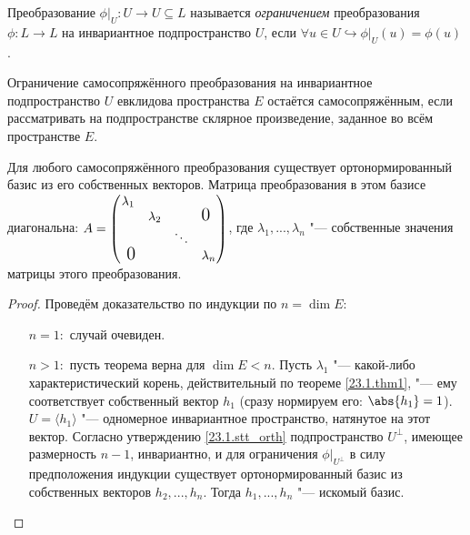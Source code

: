   \begin{defn}
  Преобразование $\phi|_U:U\rightarrow U \subseteq L$ называется \textit{ограничением} преобразования $\phi:L\rightarrow L$ на инвариантное подпространство $U$, если $\forall u \in U \hookrightarrow \phi|_U(u)=\phi(u)$.
  \end{defn}  
  \begin{notion}
  Ограничение самосопряжённого преобразования на инвариантное подпространство $U$ евклидова пространства $E$ остаётся самосопряжённым, если рассматривать на подпространстве склярное произведение, заданное во всём пространстве $E$.
  \end{notion}  
  
  \begin{thm}
  Для любого самосопряжённого преобразования существует ортонормированный базис из его собственных векторов. Матрица преобразования в этом базисе диагональна: $A=
  \begin{pmatrix}
  \lambda_1 &           &        & \\
            & \lambda_2 &        & \fudge {0 }  \\
            &			& \ddots & \\
  \fudge{ 0}&			&		 & \lambda_n \\
  \end{pmatrix}$, где $\lambda_1,...,\lambda_n$ "--- собственные значения матрицы этого преобразования.
  \end{thm}
  \begin{proof} Проведём доказательство по индукции по $n=\dim E$:
  \linebreak\vspace*{-\baselineskip}
  \begin{itemize}
  \item[\underline{$n=1:$}] случай очевиден.
  \item[\underline{$n>1:$}] пусть теорема верна для $\dim E<n$. Пусть $\lambda_1$ "--- какой-либо характеристический корень, действительный по теореме \ref{23.1.thm1}, "--- ему соответствует собственный вектор $h_1$ (сразу нормируем его: $\abs{h_1}=1$). $U=\langle h_1\rangle$ "--- одномерное инвариантное пространство, натянутое на этот вектор. Согласно утверждению \ref{23.1.stt_orth} подпространство $U^\perp$, имеющее размерность $n-1$, инвариантно, и для ограничения $\phi|_{U^\perp}$ в силу предположения индукции существует ортонормированный базис из собственных векторов $h_2,...,h_n$. Тогда $h_1,...,h_n$ "--- искомый базис.

  \end{itemize}
  \vspace{-1.65\baselineskip}  
  \end{proof}
